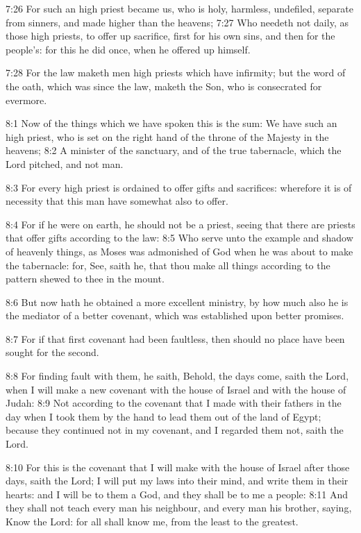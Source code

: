 7:26 For such an high priest became us, who is holy, harmless, undefiled, separate from sinners, and made higher than the heavens; 7:27 Who needeth not daily, as those high priests, to offer up sacrifice, first for his own sins, and then for the people's: for this he did once, when he offered up himself.

7:28 For the law maketh men high priests which have infirmity; but the word of the oath, which was since the law, maketh the Son, who is consecrated for evermore.

8:1 Now of the things which we have spoken this is the sum: We have such an high priest, who is set on the right hand of the throne of the Majesty in the heavens; 8:2 A minister of the sanctuary, and of the true tabernacle, which the Lord pitched, and not man.

8:3 For every high priest is ordained to offer gifts and sacrifices: wherefore it is of necessity that this man have somewhat also to offer.

8:4 For if he were on earth, he should not be a priest, seeing that there are priests that offer gifts according to the law: 8:5 Who serve unto the example and shadow of heavenly things, as Moses was admonished of God when he was about to make the tabernacle: for, See, saith he, that thou make all things according to the pattern shewed to thee in the mount.

8:6 But now hath he obtained a more excellent ministry, by how much also he is the mediator of a better covenant, which was established upon better promises.

8:7 For if that first covenant had been faultless, then should no place have been sought for the second.

8:8 For finding fault with them, he saith, Behold, the days come, saith the Lord, when I will make a new covenant with the house of Israel and with the house of Judah: 8:9 Not according to the covenant that I made with their fathers in the day when I took them by the hand to lead them out of the land of Egypt; because they continued not in my covenant, and I regarded them not, saith the Lord.

8:10 For this is the covenant that I will make with the house of Israel after those days, saith the Lord; I will put my laws into their mind, and write them in their hearts: and I will be to them a God, and they shall be to me a people: 8:11 And they shall not teach every man his neighbour, and every man his brother, saying, Know the Lord: for all shall know me, from the least to the greatest.


